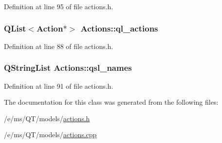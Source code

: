 Definition at line 95 of file actions.h.

\hypertarget{classActions_a203248bdd5f4dd6c480f88e58ac80fcc}{
\subsubsection[{ql\_\-actions}]{\setlength{\rightskip}{0pt plus 5cm}QList$<${\bf Action}$\ast$$>$ {\bf Actions::ql\_\-actions}}}
\label{classActions_a203248bdd5f4dd6c480f88e58ac80fcc}


Definition at line 88 of file actions.h.

\hypertarget{classActions_a863664ecad15bff8c6968ec9ecc17a4a}{
\subsubsection[{qsl\_\-names}]{\setlength{\rightskip}{0pt plus 5cm}QStringList {\bf Actions::qsl\_\-names}}}
\label{classActions_a863664ecad15bff8c6968ec9ecc17a4a}


Definition at line 91 of file actions.h.



The documentation for this class was generated from the following files:\begin{DoxyCompactItemize}
\item 
/e/ms/QT/models/\hyperlink{actions_8h}{actions.h}\item 
/e/ms/QT/models/\hyperlink{actions_8cpp}{actions.cpp}\end{DoxyCompactItemize}
